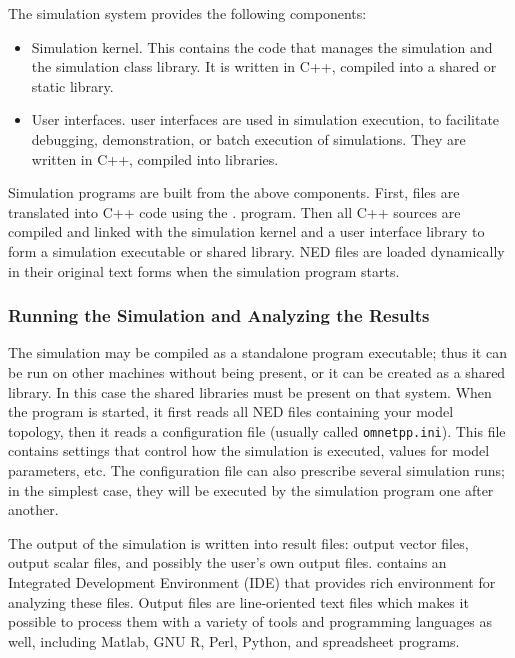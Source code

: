 The simulation system provides the following components:
\begin{itemize}
  \item{Simulation kernel. This contains the
    code that manages the simulation and the simulation class library.
    It is written in C++, compiled into a shared or static library.}
  \item{User interfaces.
     {\opp} user interfaces
    are used in simulation execution, to facilitate debugging,
    demonstration, or batch execution of simulations. They are
    written in C++, compiled into libraries.}
\end{itemize}


Simulation programs are built from the above components. First,
 files are translated into C++ code using the .
program. Then all C++ sources are compiled and linked with the simulation
kernel and a user interface library to form a simulation executable or
shared library. NED files are loaded dynamically in their original
text forms when the simulation program starts.


\subsubsection{Running the Simulation and Analyzing the Results}

The simulation may be compiled as a standalone program executable;
thus it can be run on other machines without {\opp}
being present, or it can be created as a shared library. In this case the
{\opp} shared libraries must be present on that system.
When the program is started, it first reads all NED files
containing your model topology, then it reads a configuration
file (usually called
\texttt{omnetpp.ini}). This file contains settings that
control how the simulation is executed, values for model parameters, etc.
The configuration file can also prescribe several simulation runs; in
the simplest case, they will be executed by the simulation program one
after another.

The output of the simulation is written into result files: output vector
files, output scalar files,
and possibly the user's own output files.
{\opp} contains an Integrated Development Environment (IDE) that provides
rich environment for analyzing these files. Output files are line-oriented
text files which makes it possible to process them with a variety of tools
and programming languages as well, including Matlab, GNU R, Perl, Python,
and spreadsheet programs.


